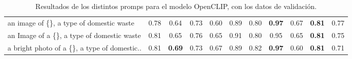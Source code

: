 \documentclass[10pt,a4paper,twocolumn,twoside]{article}
\begin{document}
\begin{table}[h]
\begin{tabular}{lcccccccccc}
  an   image of \{\}, a type of domestic waste    & 0.78          & 0.64          & 0.73          & 0.60          & 0.89          & 0.80          & \textbf{0.97} & 0.67          & \textbf{0.81} & 0.77          \\
  an   Image of a \{\}, a type of domestic waste  & 0.81          & 0.65          & 0.76          & 0.65          & 0.91          & 0.80          & 0.95          & 0.65          & \textbf{0.81} & 0.75          \\
  a bright photo of a \{\}, a type of domestic..  & 0.81          & \textbf{0.69} & 0.73          & 0.67          & 0.89          & 0.82          & \textbf{0.97} & 0.60          & \textbf{0.81} & 0.71          \\ \hline
  \end{tabular}
  \caption{Resultados de los distintos promps para el modelo OpenCLIP, con los datos de validación.}
  \label{tab:promps_a}
  \end{table}
\end{document}
